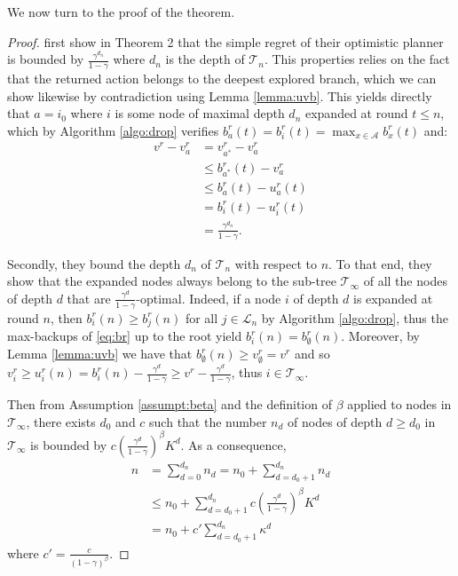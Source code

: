 \documentclass{article}
\begin{document}
We now turn to the proof of the theorem.

\begin{proof}
	\citet{Hren2008} first show in Theorem 2 that the simple regret of their optimistic planner is bounded by $\frac{\gamma^{d_n}}{1 - \gamma}$ where $d_n$ is the depth of $\mathcal{T}_n$. This properties relies on the fact that the returned action belongs to the deepest explored branch, which we can show likewise by contradiction using Lemma \ref{lemma:uvb}. This yields directly that $a = i_0$ where $i$ is some node of maximal depth $d_n$ expanded at round $t\leq n$, which by Algorithm \ref{algo:drop} verifies $b_a^r(t) = b_i^r(t) = \max_{x\in\mathcal{A}} b_x^r(t)$ and:
	\begin{align}
	\label{eq:Rndn}
	v^r - v_a^r &= v_{a^*}^r - v_a^r \\
	&\leq b_{a^*}^r(t) - v_a^r \\
	&\leq b_{a}^r(t) - u_a^r(t) \\
	&= b_{i}^r(t) - u_i^r(t) \\
	&= \frac{\gamma^{d_n}}{1-\gamma}.
	\end{align}
	
	Secondly, they bound the depth $d_n$ of $\mathcal{T}_n$ with respect to $n$. To that end, they show that the expanded nodes always belong to the sub-tree $\mathcal{T}_\infty$ of all the nodes of depth $d$ that are $\frac{\gamma^d}{1-\gamma}$-optimal. Indeed, if a node $i$ of depth $d$ is expanded at round $n$, then $b_i^r(n) \geq b_j^r(n)$ for all $j\in \mathcal{L}_n$ by Algorithm \ref{algo:drop}, thus the max-backups of \eqref{eq:br} up to the root yield $b^r_i(n) = b_\emptyset^r(n)$. Moreover, by Lemma \ref{lemma:uvb} we have that $b_\emptyset^r(n) \geq v_\emptyset^r = v^r$ and so $v_i^r \geq u_i^r(n) = b_i^r(n) - \frac{\gamma^d}{1-\gamma} \geq v^r - \frac{\gamma^d}{1-\gamma}$, thus $i \in \mathcal{T}_\infty$.
	
	Then from Assumption \ref{assumpt:beta} and the definition of $\beta$ applied to nodes in $\mathcal{T}_\infty$, there exists $d_0$ and $c$ such that the number $n_d$ of nodes of depth $d \geq d_0$ in $\mathcal{T}_\infty$ is bounded by $c\left(\frac{\gamma^d}{1-\gamma}\right)^\beta K^d$. As a consequence, 
	\begin{eqnarray*}
		n &= \sum_{d=0}^{d_n} n_d = n_0 + \sum_{d=d_0+1}^{d_n} n_d \\
		&\leq n_0 + \sum_{d=d_0+1}^{d_n} c\left(\frac{\gamma^d}{1-\gamma}\right)^\beta K^d \\
		&= n_0 + c'\sum_{d={d_0+1}}^{d_n} \kappa^d
	\end{eqnarray*}
	where $c'=\frac{c}{(1-\gamma)^\beta}$.
	

\end{proof}
\end{document}
